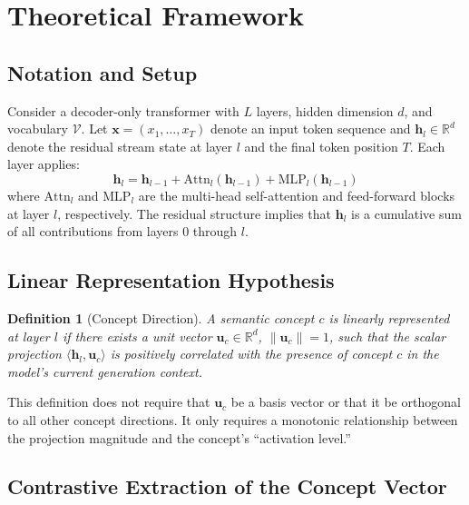 \documentclass[journal, onecolumn]{IEEEtran}
\newtheorem{definition}{Definition}
\begin{document}
\section{Theoretical Framework}
\label{sec:theory}

\subsection{Notation and Setup}

Consider a decoder-only transformer with $L$ layers, hidden dimension $d$, and vocabulary $\mathcal{V}$. Let $\bm{x} = (x_1, \ldots, x_T)$ denote an input token sequence and $\bm{h}_l \in \mathbb{R}^d$ denote the residual stream state at layer $l$ and the final token position $T$. Each layer applies:
\begin{equation}
    \bm{h}_l = \bm{h}_{l-1} + \text{Attn}_l(\bm{h}_{l-1}) + \text{MLP}_l(\bm{h}_{l-1})
    \label{eq:residual}
\end{equation}
where $\text{Attn}_l$ and $\text{MLP}_l$ are the multi-head self-attention and feed-forward blocks at layer $l$, respectively. The residual structure implies that $\bm{h}_l$ is a cumulative sum of all contributions from layers $0$ through $l$.

\subsection{Linear Representation Hypothesis}

\begin{definition}[Concept Direction]
\label{def:concept}
A semantic concept $c$ is \textit{linearly represented} at layer $l$ if there exists a unit vector $\bm{u}_c \in \mathbb{R}^d$, $\|\bm{u}_c\| = 1$, such that the scalar projection $\langle \bm{h}_l, \bm{u}_c \rangle$ is positively correlated with the presence of concept $c$ in the model's current generation context.
\end{definition}

This definition does not require that $\bm{u}_c$ be a basis vector or that it be orthogonal to all other concept directions. It only requires a monotonic relationship between the projection magnitude and the concept's ``activation level.''

\subsection{Contrastive Extraction of the Concept Vector}
\end{document}
